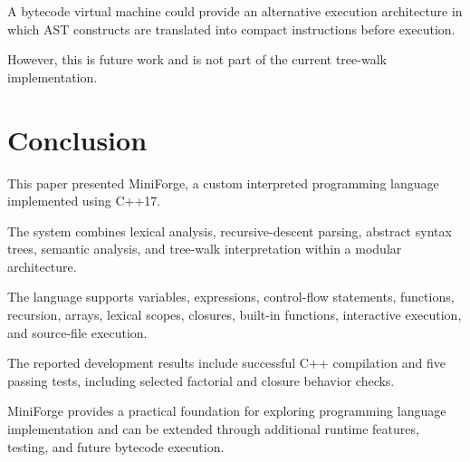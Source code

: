 \documentclass[conference]{IEEEtran}
\begin{document}
A bytecode virtual machine could provide an alternative
execution architecture in which AST constructs are
translated into compact instructions before execution.

However, this is future work and is not part of the
current tree-walk implementation.

\section{Conclusion}

This paper presented MiniForge, a custom interpreted
programming language implemented using C++17.

The system combines lexical analysis, recursive-descent
parsing, abstract syntax trees, semantic analysis,
and tree-walk interpretation within a modular
architecture.

The language supports variables, expressions,
control-flow statements, functions, recursion,
arrays, lexical scopes, closures, built-in functions,
interactive execution, and source-file execution.

The reported development results include successful
C++ compilation and five passing tests, including
selected factorial and closure behavior checks.

MiniForge provides a practical foundation for
exploring programming language implementation
and can be extended through additional runtime
features, testing, and future bytecode execution.
\end{document}
